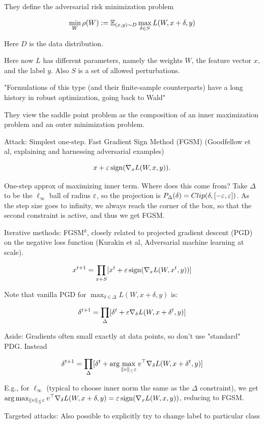 \documentclass[english]{article}
\begin{document}
They define the adversarial risk minimization problem

$$
\min_W \rho(W):=\mathbb{E}_{(x,y)\sim D} \max_{\delta\in S} L(W,x+\delta,y)
$$

Here $D$ is the data distribution.

Here now $L$ has different parameters, namely the weights $W$, the feature vector $x$, and the label $y$. Also $S$ is a set of allowed perturbations. 

"Formulations of this type (and their finite-sample counterparts) have a long history in robust optimization, going back to Wald"

They view the saddle point problem as the composition of an inner maximization problem and an outer minimization problem.

\benum 
\item  Attack: Simplest one-step. Fast Gradient Sign Method (FGSM) (Goodfellow et al, explaining and harnessing adversarial examples)

$$x + \varepsilon \operatorname{sign}(\nabla_x L(W,x,y)).$$

One-step approx of maximizing inner term. Where does this come from? Take $\Delta$ to be the $\ell_\infty$ ball of radius $\varepsilon$, so the projection is $P_\Delta(\delta) = Clip(\delta,[-\varepsilon,\varepsilon])$. As the step size goes to infinity, we always reach the corner of the box, so that the second constraint is active, and thus we get FGSM.

Iterative methods: FGSM$^k$, closely related to projected gradient descent (PGD) on the negative loss function (Kurakin et al, Adversarial machine learning at scale). 

$$x^{t+1} = \prod_{x+S}[x^t+ \varepsilon \operatorname{sign}(\nabla_x L(W,x^t,y))]$$ 

Note that vanilla PGD for $\max_{\delta\in\Delta} L(W,x+\delta,y)$ is: 

$$\delta^{t+1}=\prod_{\Delta}[\delta^t+\varepsilon \nabla_\delta L(W,x+\delta^t,y)]$$ 


Aside: Gradients often small exactly at data points, so don't use "standard" PDG. Instead


$$\delta^{t+1}=\prod_{\Delta}[\delta^t+
\arg\max_{\|v\|_\le \varepsilon} v^\top \nabla_\delta L(W,x+\delta^t,y)]$$

E.g., for $\ell_\infty$ (typical to choose inner norm the same as the $\Delta$ constraint), we get $\arg\max_{\|v\|_\le \varepsilon} v^\top \nabla_\delta L(W,x+\delta,y) = \varepsilon \operatorname{sign}(\nabla_x L(W,x,y))$, reducing to FGSM.

\item Targeted attacks: Also possible to explicitly try to change label to particular class 
\end{document}

